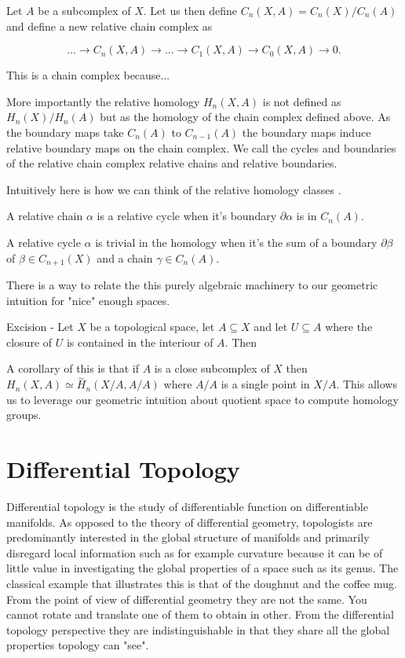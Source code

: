 Let $A$ be a subcomplex of $X$. Let us then define $C_n(X, A) = C_n(X) / C_n(A)$ and define a new relative chain complex as

$$ ... \longrightarrow C_n(X, A) \longrightarrow ... \longrightarrow C_1(X, A) \longrightarrow C_0(X, A) \longrightarrow 0. $$

This is a chain complex because...

More importantly the relative homology $H_n(X, A)$ is not defined as $H_n(X) / H_n(A)$ but as the homology of the chain complex defined above. As the boundary maps take $C_n(A)$ to $C_{n-1}(A)$ the boundary maps induce relative boundary maps on the chain complex. We call the cycles and boundaries of the relative chain complex relative chains and relative boundaries.

Intuitively here is how we can think of the relative homology classes \cite{algebraic-topology}.

A relative chain $\alpha$ is a relative cycle when it's boundary $\partial\alpha $ is in $C_n(A)$.

A relative cycle $\alpha$ is trivial in the homology when it's the sum of a boundary $\partial \beta$ of $\beta \in C_{n+1}(X)$ and a chain $\gamma \in C_n(A)$.

There is a way to relate the this purely algebraic machinery to our geometric intuition for "nice" enough spaces.


\begin{thm} Excision - Let $X$ be a topological space, let $A \subseteq X$ and let $U \subseteq A$ where the closure of $U$ is contained in the interiour of $A$. Then   \end{thm}


A corollary of this is that if $A$ is a close subcomplex of $X$ then $H_n(X, A) \simeq \overset{\sim}{H}_n(X/A, A/A)$ where $A/A$ is a single point in $X/A$. This allows us to leverage our geometric intuition about quotient space to compute homology groups.



\section{Differential Topology}

Differential topology is the study of differentiable function on differentiable manifolds. As opposed to the theory of differential geometry, topologists are predominantly interested in the global structure of manifolds and primarily disregard local information such as for example curvature because it can be of little value in investigating the global properties of a space such as its genus. The classical example that illustrates this is that of the doughnut and the coffee mug. From the point of view of differential geometry they are not the same. You cannot rotate and translate one of them to obtain in other. From the differential topology perspective they are indistinguishable in that they share all the global properties topology can "see".   

